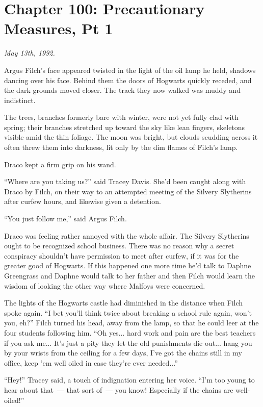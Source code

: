 \chapter{Chapter 100: Precautionary Measures, Pt 1}
\emph{May 13th, 1992.}

Argus Filch's face appeared twisted in the light of the oil lamp he held, shadows dancing over his face. Behind them the doors of Hogwarts quickly receded, and the dark grounds moved closer. The track they now walked was muddy and indistinct.

The trees, branches formerly bare with winter, were not yet fully clad with spring; their branches stretched up toward the sky like lean fingers, skeletons visible amid the thin foliage. The moon was bright, but clouds scudding across it often threw them into darkness, lit only by the dim flames of Filch's lamp.

Draco kept a firm grip on his wand.

``Where are you taking us?'' said Tracey Davis. She'd been caught along with Draco by Filch, on their way to an attempted meeting of the Silvery Slytherins after curfew hours, and likewise given a detention.

``You just follow me,'' said Argus Filch.

Draco was feeling rather annoyed with the whole affair. The Silvery Slytherins ought to be recognized school business. There was no reason why a secret conspiracy shouldn't have permission to meet after curfew, if it was for the greater good of Hogwarts. If this happened one more time he'd talk to Daphne Greengrass and Daphne would talk to her father and then Filch would learn the wisdom of looking the other way where Malfoys were concerned.

The lights of the Hogwarts castle had diminished in the distance when Filch spoke again. ``I bet you'll think twice about breaking a school rule again, won't you, eh?'' Filch turned his head, away from the lamp, so that he could leer at the four students following him. ``Oh yes... hard work and pain are the best teachers if you ask me... It's just a pity they let the old punishments die out... hang you by your wrists from the ceiling for a few days, I've got the chains still in my office, keep 'em well oiled in case they're ever needed...''

``Hey!'' Tracey said, a touch of indignation entering her voice. ``I'm too young to hear about that~--- that sort of~--- you know! Especially if the chains are well-oiled!''

